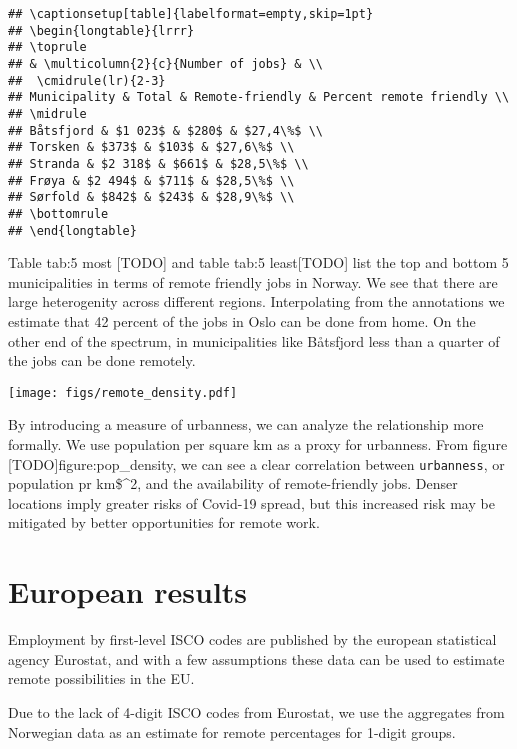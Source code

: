 \documentclass[11pt,]{article}
\begin{document}
\begin{verbatim}
## \captionsetup[table]{labelformat=empty,skip=1pt}
## \begin{longtable}{lrrr}
## \toprule
## & \multicolumn{2}{c}{Number of jobs} & \\ 
##  \cmidrule(lr){2-3}
## Municipality & Total & Remote-friendly & Percent remote friendly \\ 
## \midrule
## Båtsfjord & $1 023$ & $280$ & $27,4\%$ \\ 
## Torsken & $373$ & $103$ & $27,6\%$ \\ 
## Stranda & $2 318$ & $661$ & $28,5\%$ \\ 
## Frøya & $2 494$ & $711$ & $28,5\%$ \\ 
## Sørfold & $842$ & $243$ & $28,9\%$ \\ 
## \bottomrule
## \end{longtable}
\end{verbatim}

Table tab:5 most {[}TODO{]} and table tab:5 least{[}TODO{]} list the top
and bottom 5 municipalities in terms of remote friendly jobs in Norway.
We see that there are large heterogenity across different regions.
Interpolating from the annotations we estimate that 42 percent of the
jobs in Oslo can be done from home. On the other end of the spectrum, in
municipalities like Båtsfjord less than a quarter of the jobs can be
done remotely.

\texttt{[image: figs/remote\_density.pdf]}

By introducing a measure of urbanness, we can analyze the relationship
more formally. We use population per square km as a proxy for urbanness.
From figure {[}TODO{]}figure:pop\_density, we can see a clear
correlation between \texttt{urbanness}, or population pr km\$\^{}2, and
the availability of remote-friendly jobs. Denser locations imply greater
risks of Covid-19 spread, but this increased risk may be mitigated by
better opportunities for remote work.

\hypertarget{european-results}{%
\section{European results}\label{european-results}}

Employment by first-level ISCO codes are published by the european
statistical agency Eurostat, and with a few assumptions these data can
be used to estimate remote possibilities in the EU.

Due to the lack of 4-digit ISCO codes from Eurostat, we use the
aggregates from Norwegian data as an estimate for remote percentages for
1-digit groups.
\end{document}
